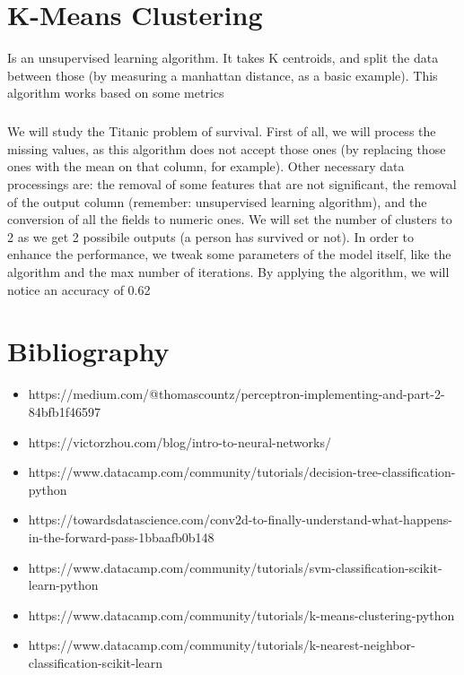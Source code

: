\documentclass[a4paper,12pt]{report}
\begin{document}
{\let\clearpage\relax \chapter{K-Means Clustering}}
Is an unsupervised learning algorithm. It takes K centroids, and split the data between those (by measuring a manhattan distance, as a basic example). This algorithm works based on some metrics 
\paragraph{}
We will study the Titanic problem of survival. First of all, we will process the missing values, as this algorithm does not accept those ones (by replacing those ones with the mean on that column, for example). Other necessary data processings are: the removal of some features that are not significant, the removal of the output column (remember: unsupervised learning algorithm), and the conversion of all the fields to numeric ones. We will set the number of clusters to 2 as we get 2 possibile outputs (a person has survived or not). In order to enhance the performance, we tweak some parameters of the model itself, like the algorithm and the max number of iterations. By applying the algorithm, we will notice an accuracy of 0.62

{\let\clearpage\relax \chapter{Bibliography}}
\begin{itemize}
    \item https://medium.com/@thomascountz/perceptron-implementing-and-part-2-84bfb1f46597
    \item https://victorzhou.com/blog/intro-to-neural-networks/
    \item https://www.datacamp.com/community/tutorials/decision-tree-classification-python
    \item https://towardsdatascience.com/conv2d-to-finally-understand-what-happens-in-the-forward-pass-1bbaafb0b148
    \item https://www.datacamp.com/community/tutorials/svm-classification-scikit-learn-python
    \item https://www.datacamp.com/community/tutorials/k-means-clustering-python
    \item https://www.datacamp.com/community/tutorials/k-nearest-neighbor-classification-scikit-learn
\end{itemize}
\end{document}
